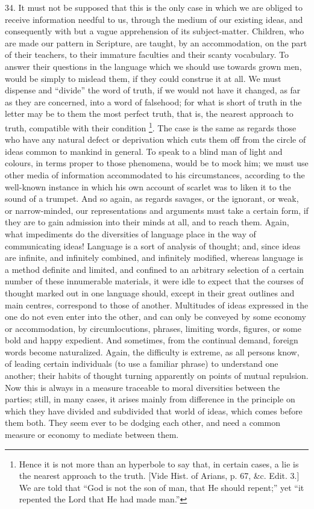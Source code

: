 34. It must not be supposed that this is the only case in which we
are obliged to receive information needful to us, through the medium
of our existing ideas, and consequently with but a vague apprehension
of its subject-matter. Children, who are made our pattern in
Scripture, are taught, by an accommodation, on the part of their
teachers, to their immature faculties and their scanty vocabulary. To
answer their questions in the language which we should use towards
grown men, would be simply to mislead them, if they could construe it
at all. We must dispense and ``divide'' the word of truth, if
we would not have it changed, as far as they are concerned, into a
word of falsehood; for what is short of truth in the letter may be to
them the most perfect truth, that is, the nearest approach to truth,
compatible with their condition \footnote{Hence it is not more than an hyperbole to say that, in certain
cases, a lie is the nearest approach to the truth. [Vide Hist. of
Arians, p. 67, \&c. Edit. 3.] We are told that ``God is not the
son of man, that He should repent;'' yet ``it repented the
Lord that He had made man.''}. The case is the same as
regards those who have any natural defect or deprivation which cuts
them off from the circle of ideas common to mankind in general. To
speak to a blind man of light and colours, in terms proper to those
phenomena, would be to mock him; we must use other media of
information accommodated to his circumstances, according to the
well-known instance in which his own account of scarlet was to liken
it to the sound of a trumpet. And so again, as regards savages, or the
ignorant, or weak, or narrow-minded, our representations and arguments
must take a certain form, if they are to gain admission into their
minds at all, and to reach them. Again, what impediments do the
diversities of language place in the way of communicating ideas!
Language is a sort of analysis of thought; and, since ideas are
infinite, and infinitely combined, and infinitely modified, whereas
language is a method definite and limited, and confined to an
arbitrary selection of a certain number of these innumerable
materials, it were idle to expect that the courses of thought marked
out in one language should, except in their great outlines and main
centres, correspond to those of another. Multitudes of ideas expressed
in the one do not even enter into the other, and can only be conveyed
by some economy or accommodation, by circumlocutions, phrases,
limiting words, figures, or some bold and happy expedient. And
sometimes, from the continual demand, foreign words become
naturalized. Again, the difficulty is extreme, as all persons know, of
leading certain individuals (to use a familiar phrase) to understand
one another; their habits of thought turning apparently on points of
mutual repulsion. Now this is always in a measure traceable to moral
diversities between the parties; still, in many cases, it arises
mainly from difference in the principle on which they have divided and
subdivided that world of ideas, which comes before them both. They
seem ever to be dodging each other, and need a common measure or
economy to mediate between them.

